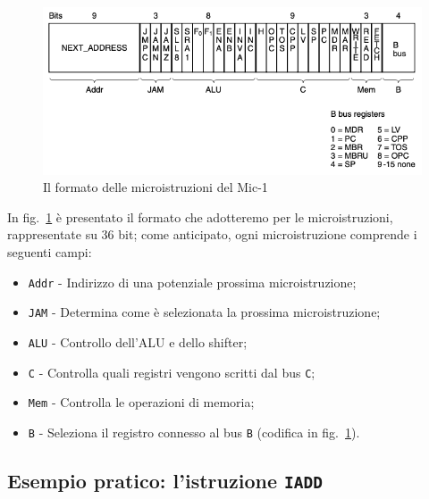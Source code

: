 \documentclass[a4paper,12pt]{scrreprt}
\begin{document}
\begin{figure}
  \centering
  \includegraphics[width=\textwidth]{mu_instr.png}
  \caption{Il formato delle microistruzioni del Mic-1}\label{fig:mu_instr}
\end{figure}

In fig.~\ref{fig:mu_instr} è presentato il formato che adotteremo per le
microistruzioni, rappresentate su 36 bit; come anticipato, ogni microistruzione
comprende i seguenti campi:
\begin{itemize}
  \item \lstinline{Addr} - Indirizzo di una potenziale prossima microistruzione;
  \item \lstinline{JAM} - Determina come è selezionata la prossima
  microistruzione;
  \item \lstinline{ALU} - Controllo dell'ALU e dello shifter;
  \item \lstinline{C} - Controlla quali registri vengono scritti dal bus
  \lstinline{C};
  \item \lstinline{Mem} - Controlla le operazioni di memoria;
  \item \lstinline{B} - Seleziona il registro connesso al bus \lstinline{B}
  (codifica in fig.~\ref{fig:mu_instr}).
\end{itemize}

\subsection{Esempio pratico: l'istruzione \lstinline{IADD}}
\end{document}
